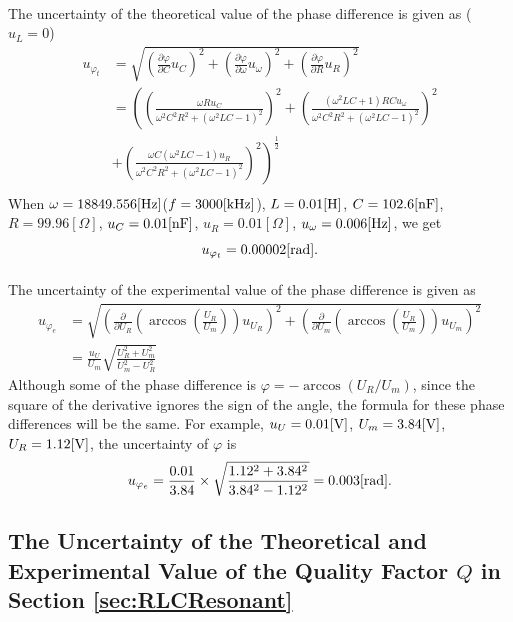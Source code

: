 \documentclass{my_template}
\renewcommand{\phi}{\varphi}
\begin{document}
    \paragraph{} The uncertainty of the theoretical value of the phase difference is given as ($u_L=0$)\label{sec:u}
    \begin{equation*}
        \begin{split}
            u_{\phi_t}&=\sqrt{\left(\frac{\partial\phi}{\partial C}u_C\right)^2+\left(\frac{\partial\phi}{\partial \omega}u_\omega\right)^2+\left(\frac{\partial\phi}{\partial R}u_R\right)^2}\\
            &=\left(\left(\frac{\omega Ru_C}{\omega^2C^2R^2+(\omega^2LC-1)^2}\right)^2+\left(\frac{(\omega^2LC+1)RCu_\omega}{\omega^2C^2R^2+(\omega^2LC-1)^2}\right)^2\right.\\
            &+\left.\left(\frac{\omega C(\omega^2LC-1)u_R}{\omega^2C^2R^2+(\omega^2LC-1)^2}\right)^2\right)^{\frac{1}{2}}\\
        \end{split}
    \end{equation*}
    When $\omega=18849.556[\rm Hz]$($f=3000[\rm kHz]$), $L=0.01[\rm H]$, $C=102.6[\rm nF]$, $R=99.96[\Omega]$, $u_C=0.01[\rm nF]$, $u_R=0.01[\Omega]$, $u_\omega=0.006[\rm Hz]$, we get $$u_{\phi_t}=0.00002[\rm rad].$$
    \paragraph{} The uncertainty of the experimental value of the phase difference is given as 
    \begin{equation*}
        \begin{split}
            u_{\phi_e}&=\sqrt{\left(\frac{\partial}{\partial U_R}\left(\arccos\left(\frac{U_R}{U_m}\right)\right)u_{U_R}\right)^2+\left(\frac{\partial}{\partial U_m}\left(\arccos\left(\frac{U_R}{U_m}\right)\right)u_{U_m}\right)^2}\\
            &=\frac{u_U}{U_m}\sqrt{\frac{U_R^2+U_m^2}{U_m^2-U_R^2}}
        \end{split}
    \end{equation*}
    Although some of the phase difference is $\phi=-\arccos(U_R/U_m)$, since the square of the derivative ignores the sign of the angle, the formula for these phase differences will be the same. For example, $u_U=0.01[\rm V]$, $U_m=3.84[\rm V]$, $U_R=1.12[\rm V]$, the uncertainty of $\phi$ is $$u_{\phi_e}=\frac{0.01}{3.84}\times\sqrt{\frac{1.12^2+3.84^2}{3.84^2-1.12^2}}=0.003[\rm rad].$$ 
    \subsection{The Uncertainty of the Theoretical and Experimental Value of the Quality Factor $Q$ in Section \ref{sec:RLCResonant}}
\end{document}
